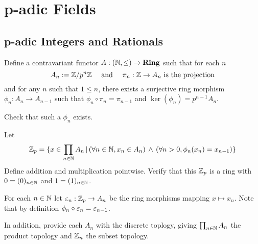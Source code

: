 \chapter{p-adic Fields}
\section{p-adic Integers and Rationals}
\begin{dfn}
    Define a contravariant functor $A : (\mathbb{N},\le) \to \mathbf{Ring}$ 
    such that for each $n$
    \[A_n := \mathbb{Z} / p^n \mathbb{Z} \quad \text{ and } 
    \quad \pi_n : \mathbb{Z} \to A_n \text{ is the projection}\]
    and for any $n$ such that $1 \le n$, 
    there exists a surjective ring morphism 
    $\phi_n : A_n \to A_{n-1}$ such that
    $\phi_n \circ \pi_n = \pi_{n-1}$ and 
    $\ker(\phi_n) = p^{n-1} A_n$.
\end{dfn}
\begin{ex}
    Check that such a $\phi_n$ exists.
\end{ex}

\begin{dfn}
    Let 
    \[\mathbb{Z}_p = \{x \in \prod_{n \in \mathbb{N}} A_n \,|\, 
    (\forall n \in \mathbb{N}, x_n \in A_n) \, \land \,
    (\forall n > 0, \phi_n(x_n) = x_{n-1})\}\]
    Define addition and multiplication pointwise. 
    Verify that this $\mathbb{Z}_p$ is a ring with $0 = (0)_{n \in \mathbb{N}}$
    and $1 = (1)_{n \in \mathbb{N}}$.

    For each $n \in \mathbb{N}$ let $\varepsilon_n : \mathbb{Z}_p \to A_n$ be the 
    ring morphisms mapping $x \mapsto x_n$.
    Note that by definition $\phi_n \circ \varepsilon_n = \varepsilon_{n-1}$.

    In addition,
    provide each $A_n$  with the discrete toplogy,
    giving $\prod_{n \in \mathbb{N}} A_n$ the product topology
    and $\mathbb{Z}_n$ the subset topology.
\end{dfn}

